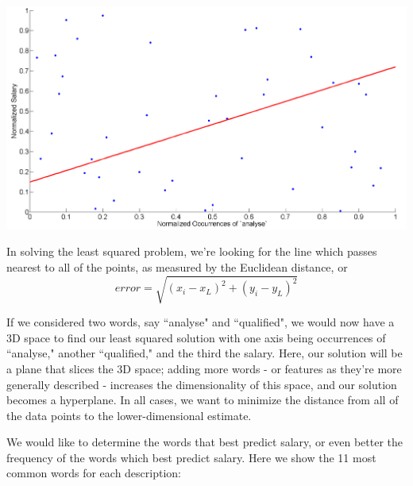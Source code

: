 \documentclass[12pt]{article}
\begin{document}
    \begin{center}
    \includegraphics[width=\linewidth]{figLSE}
    \end{center}
    
    In solving the least squared problem, we're looking for the line which passes nearest to all of the points, as measured by the Euclidean distance, or
    \begin{equation}
    error = \sqrt{ (x_i - x_L)^2 + (y_i - y_L)^2} 
    \end{equation}
 
    If we considered two words, say ``analyse" and ``qualified", we would now have a 3D space to find our least squared solution with one axis being occurrences of ``analyse," another ``qualified," and the third the salary.
    Here, our solution will be a plane that slices the 3D space; adding more words - or features as they're more generally described - increases the dimensionality of this space, and our solution becomes a hyperplane.
    In all cases, we want to minimize the distance from all of the data points to the lower-dimensional estimate.
    
    We would like to determine the words that best predict salary, or even better the frequency of the words which best
    predict salary. Here we show the 11 most common words for each description:
\end{document}
